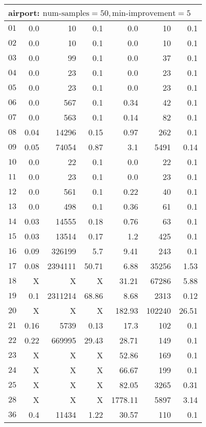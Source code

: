 \begin{longtable}{|c||r|r|r||r|r|r|}
\multicolumn{7}{|l|}{airport: $\text{num-samples}=50,\text{min-improvement}=5$}\\\hline
$01$ & 0.0 & 10 & 0.1 &0.0 & 10 & 0.1 \\\hline
$02$ & 0.0 & 10 & 0.1 &0.0 & 10 & 0.1 \\\hline
$03$ & 0.0 & 99 & 0.1 &0.0 & 37 & 0.1 \\\hline
$04$ & 0.0 & 23 & 0.1 &0.0 & 23 & 0.1 \\\hline
$05$ & 0.0 & 23 & 0.1 &0.0 & 23 & 0.1 \\\hline
$06$ & 0.0 & 567 & 0.1 &0.34 & 42 & 0.1 \\\hline
$07$ & 0.0 & 563 & 0.1 &0.14 & 82 & 0.1 \\\hline
$08$ & 0.04 & 14296 & 0.15 &0.97 & 262 & 0.1 \\\hline
$09$ & 0.05 & 74054 & 0.87 &3.1 & 5491 & 0.14 \\\hline
$10$ & 0.0 & 22 & 0.1 &0.0 & 22 & 0.1 \\\hline
$11$ & 0.0 & 23 & 0.1 &0.0 & 23 & 0.1 \\\hline
$12$ & 0.0 & 561 & 0.1 &0.22 & 40 & 0.1 \\\hline
$13$ & 0.0 & 498 & 0.1 &0.36 & 61 & 0.1 \\\hline
$14$ & 0.03 & 14555 & 0.18 &0.76 & 63 & 0.1 \\\hline
$15$ & 0.03 & 13514 & 0.17 &1.2 & 425 & 0.1 \\\hline
$16$ & 0.09 & 326199 & 5.7 &9.41 & 243 & 0.1 \\\hline
$17$ & 0.08 & 2394111 & 50.71 &6.88 & 35256 & 1.53 \\\hline
$18$ & X & X & X &31.21 & 67286 & 5.88 \\\hline
$19$ & 0.1 & 2311214 & 68.86 &8.68 & 2313 & 0.12 \\\hline
$20$ & X & X & X &182.93 & 102240 & 26.51 \\\hline
$21$ & 0.16 & 5739 & 0.13 &17.3 & 102 & 0.1 \\\hline
$22$ & 0.22 & 669995 & 29.43 &28.71 & 149 & 0.1 \\\hline
$23$ & X & X & X &52.86 & 169 & 0.1 \\\hline
$24$ & X & X & X &66.67 & 199 & 0.1 \\\hline
$25$ & X & X & X &82.05 & 3265 & 0.31 \\\hline
$28$ & X & X & X &1778.11 & 5897 & 3.14 \\\hline
$36$ & 0.4 & 11434 & 1.22 &30.57 & 110 & 0.1 \\\hline

\end{longtable}
